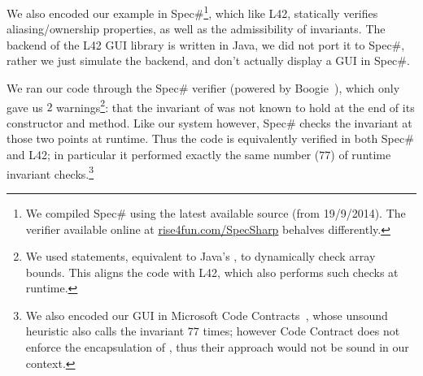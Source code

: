 


We also encoded our example in Spec\#\footnote{We compiled Spec\# using the latest available source (from 19/9/2014). The verifier available online at \url{rise4fun.com/SpecSharp} behalves differently.}, which like L42, statically verifies aliasing/ownership properties, as well as the admissibility of invariants.
The backend of the L42 GUI library is written in Java, we did not port it to Spec\#, rather we just simulate the backend, and don't actually display a GUI in Spec\#.

We ran our code through the Spec\# verifier (powered by Boogie~\cite{DBLP:conf/fmco/BarnettCDJL05}), which only gave us $2$ warnings\footnote{We used \Q@assume@ statements, equivalent to Java's \Q@assert@, to dynamically check array bounds. %
This aligns the code with L42, which also performs such checks at runtime.}: that the invariant of \Q@SafeMovable@ was not known to hold at the end of its constructor and \Q@dispatch@ method. Like our system however, Spec\# checks the invariant
at those two points at runtime. Thus the code is equivalently verified in both Spec\# and L42; in particular it performed exactly the same number ($77$) of runtime invariant checks.\footnote{%
We also encoded our GUI in Microsoft Code Contracts~\cite{DBLP:conf/sac/FahndrichBL10}, whose unsound heuristic also calls the invariant $77$ times; however Code Contract does not enforce the
encapsulation of \Q@children@, thus their approach would not be sound in our context.}

